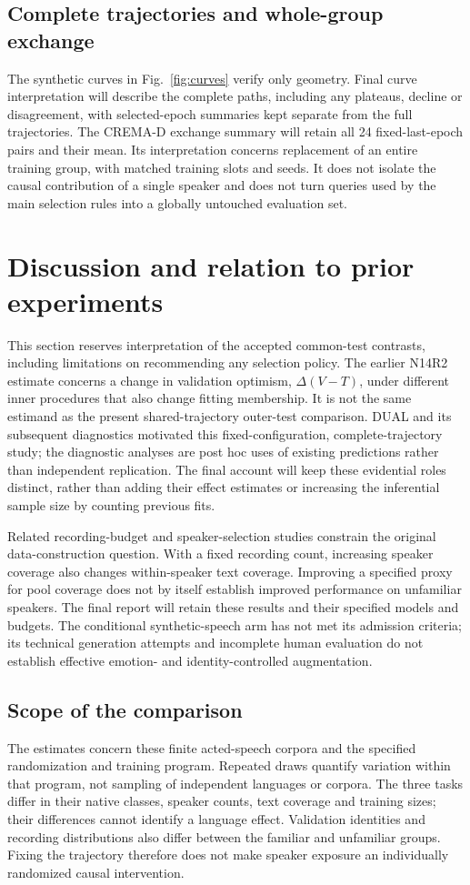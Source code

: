 \documentclass[letterpaper]{article}
\begin{document}
\subsection{Complete trajectories and whole-group exchange}
The synthetic curves in Fig.~\ref{fig:curves} verify only geometry. Final curve interpretation will describe the complete paths, including any plateaus, decline or disagreement, with selected-epoch summaries kept separate from the full trajectories. The CREMA-D exchange summary will retain all 24 fixed-last-epoch pairs and their mean. Its interpretation concerns replacement of an entire training group, with matched training slots and seeds. It does not isolate the causal contribution of a single speaker and does not turn queries used by the main selection rules into a globally untouched evaluation set.

\section{Discussion and relation to prior experiments}
This section reserves interpretation of the accepted common-test contrasts, including limitations on recommending any selection policy. The earlier N14R2 estimate concerns a change in validation optimism, $\Delta(V-T)$, under different inner procedures that also change fitting membership. It is not the same estimand as the present shared-trajectory outer-test comparison. DUAL and its subsequent diagnostics motivated this fixed-configuration, complete-trajectory study; the diagnostic analyses are post hoc uses of existing predictions rather than independent replication. The final account will keep these evidential roles distinct, rather than adding their effect estimates or increasing the inferential sample size by counting previous fits.

Related recording-budget and speaker-selection studies constrain the original data-construction question. With a fixed recording count, increasing speaker coverage also changes within-speaker text coverage. Improving a specified proxy for pool coverage does not by itself establish improved performance on unfamiliar speakers. The final report will retain these results and their specified models and budgets. The conditional synthetic-speech arm has not met its admission criteria; its technical generation attempts and incomplete human evaluation do not establish effective emotion- and identity-controlled augmentation.

\subsection{Scope of the comparison}
The estimates concern these finite acted-speech corpora and the specified randomization and training program. Repeated draws quantify variation within that program, not sampling of independent languages or corpora. The three tasks differ in their native classes, speaker counts, text coverage and training sizes; their differences cannot identify a language effect. Validation identities and recording distributions also differ between the familiar and unfamiliar groups. Fixing the trajectory therefore does not make speaker exposure an individually randomized causal intervention.
\end{document}
